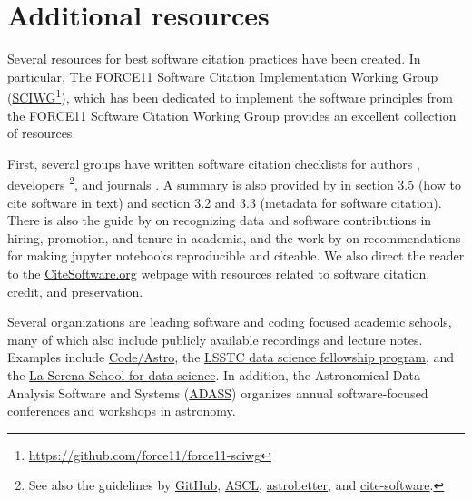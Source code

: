\documentclass[twocolumn,linenumbers]{aastex631}
\begin{document}

\section{Additional resources}
%
Several resources for best software citation practices have been created. In particular, The FORCE11 Software Citation Implementation Working Group (\href{https://github.com/force11/force11-sciwg}{SCIWG}\footnote{\url{https://github.com/force11/force11-sciwg}}), which has been dedicated to implement the software principles from the FORCE11 Software Citation Working Group provides an excellent collection of resources.

First, several groups have written software citation checklists for authors \citep{smith2016software, chue_hong_2019_3479199,  katz2020recognizing}, developers \citep{chue_hong_2019_3482769, albert_2019_3581326, 2020arXiv201213117B}\footnote{See also the guidelines by \href{https://docs.github.com/en/repositories/archiving-a-github-repository/referencing-and-citing-content}{GitHub}, \href{https://ascl.net/home/getwp/351}{ASCL}, \href{https://www.astrobetter.com/blog/2019/07/01/citing-astronomy-software-inline-text-examples/}{astrobetter}, and \href{https://cfa-library.github.io/citesoftware.org/}{cite-software}.}, and journals \citep{katz2020recognizing, stall2023journal}. A summary is also provided by \citet{Katz:2019} in section 3.5 (how to cite software in text) and section 3.2 and 3.3 (metadata for software citation).  There is also the guide by \citet{puebla2024ten} on recognizing data and software contributions in hiring, promotion, and tenure in academia, and the work by \citet{Wofford:2020, erdmann_2021_5651648, AAS_jupyter_notebook_policy} on recommendations for making jupyter notebooks reproducible and citeable. We also direct the reader to the \href{https://cfa-library.github.io/citesoftware.org/resources/}{CiteSoftware.org} webpage with resources related to software citation, credit, and preservation.

Several organizations are leading software and coding focused academic schools, many of which also include publicly available recordings and lecture notes. Examples include \href{https://github.com/semaphoreP/codeastro}{{Code/Astro}}, the \href{https://lsstdiscoveryalliance.org/programs/data-science-fellowship/}{LSSTC data science fellowship program}, and the \href{http://lssds.aura-astronomy.org/winter_school/}{La Serena School for data science}. In addition, the Astronomical Data Analysis Software and Systems (\href{https://www.adass.org}{ADASS}) organizes annual software-focused conferences and workshops in astronomy. 
\end{document}
